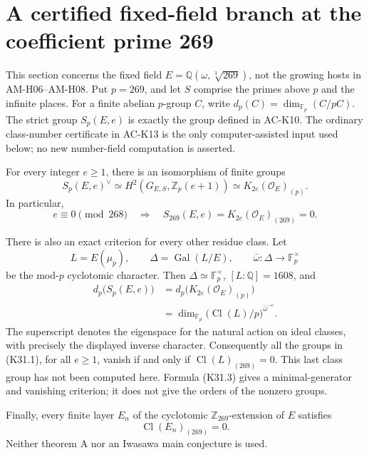\section{A certified fixed-field branch at the coefficient prime 269}
\label{sec:cubic-fixed-269-classes}

This section concerns the fixed field
\(E=\mathbb Q(\omega,\sqrt[3]{269})\), not the growing hosts in
AM-H06--AM-H08.  Put \(p=269\), and let \(S\) comprise the primes
above \(p\) and the infinite places.  For a finite abelian
\(p\)-group \(C\), write
\(d_p(C)=\dim_{\mathbb F_p}(C/pC)\).  The strict group
\(S_p(E,e)\) is exactly the group defined in AC-K10.
The ordinary class-number certificate in AC-K13 is the only
computer-assisted input used below; no new number-field computation
is asserted.

\begin{theorem}
\label{AC-K31}
For every integer \(e\geq1\), there is an isomorphism of finite groups
\[
 S_p(E,e)^\vee\simeq
 H^2(G_{E,S},\mathbb Z_p(e+1))
 \simeq K_{2e}(\mathcal O_E)_{(p)}.                 \tag{K31.1}
\]
In particular,
\[
 e\equiv0\pmod{268}
 \quad\Longrightarrow\quad
 S_{269}(E,e)=K_{2e}(\mathcal O_E)_{(269)}=0.       \tag{K31.2}
\]

There is also an exact criterion for every other residue class.
Let
\[
 L=E(\mu_p),\qquad
 \Delta=\operatorname{Gal}(L/E),\qquad
 \bar\omega:\Delta\longrightarrow\mathbb F_p^\times
\]
be the mod-\(p\) cyclotomic character.  Then
\(\Delta\simeq\mathbb F_p^\times\), \([L:\mathbb Q]=1608\),
and
\[
\begin{split}
 d_p\bigl(S_p(E,e)\bigr)
 &=d_p\bigl(K_{2e}(\mathcal O_E)_{(p)}\bigr)\\
 &=\dim_{\mathbb F_p}
       \bigl(\operatorname{Cl}(L)/p\bigr)^{\bar\omega^{-e}}.
\end{split}                                                   \tag{K31.3}
\]
The superscript denotes the eigenspace for the natural action on
ideal classes, with precisely the displayed inverse character.
Consequently all the groups in (K31.1), for all \(e\geq1\),
vanish if and only if \(\operatorname{Cl}(L)_{(269)}=0\).
This last class group has not been computed here.  Formula
(K31.3) gives a minimal-generator and vanishing criterion; it
does not give the orders of the nonzero groups.

Finally, every finite layer \(E_n\) of the cyclotomic
\(\mathbb Z_{269}\)-extension of \(E\) satisfies
\[
                   \operatorname{Cl}(E_n)_{(269)}=0.           \tag{K31.4}
\]
Neither theorem A nor an Iwasawa main conjecture is used.
\end{theorem}
